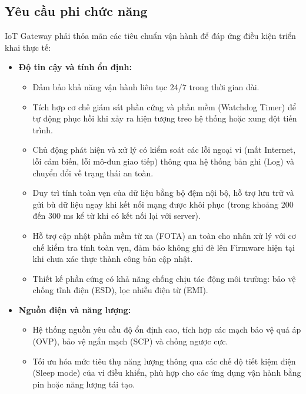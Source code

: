     \subsection{Yêu cầu phi chức năng}
        IoT Gateway phải thỏa mãn các tiêu chuẩn vận hành để đáp ứng điều kiện triển khai thực tế:
        \begin{itemize}
            \item \textbf{Độ tin cậy và tính ổn định:}
            \begin{itemize}
                \item Đảm bảo khả năng vận hành liên tục 24/7 trong thời gian dài.
                \item Tích hợp cơ chế giám sát phần cứng và phần mềm (Watchdog Timer) để tự động phục hồi khi xảy ra hiện tượng treo hệ thống hoặc xung đột tiến trình.
                \item Chủ động phát hiện và xử lý có kiểm soát các lỗi ngoại vi (mất Internet, lỗi cảm biến, lỗi mô-đun giao tiếp) thông qua hệ thống bản ghi (Log) và chuyển đổi về trạng thái an toàn.
                \item Duy trì tính toàn vẹn của dữ liệu bằng bộ đệm nội bộ, hỗ trợ lưu trữ và gửi bù dữ liệu ngay khi kết nối mạng được khôi phục (trong khoảng 200 đến 300 ms kể từ khi có kết nối lại với server).
                \item Hỗ trợ cập nhật phần mềm từ xa (FOTA) an toàn cho nhân xử lý với cơ chế kiểm tra tính toàn vẹn, đảm bảo không ghi đè lên Firmware hiện tại khi chưa xác thực thành công bản cập nhật.
                \item Thiết kế phần cứng có khả năng chống chịu tác động môi trường: bảo vệ chống tĩnh điện (ESD), lọc nhiễu điện từ (EMI).
            \end{itemize}
            
            \item \textbf{Nguồn điện và năng lượng:}
            \begin{itemize}
                \item Hệ thống nguồn yêu cầu độ ổn định cao, tích hợp các mạch bảo vệ quá áp (OVP), bảo vệ ngắn mạch (SCP) và chống ngược cực.
                \item Tối ưu hóa mức tiêu thụ năng lượng thông qua các chế độ tiết kiệm điện (Sleep mode) của vi điều khiển, phù hợp cho các ứng dụng vận hành bằng pin hoặc năng lượng tái tạo.
            \end{itemize}
            

\end{itemize}
